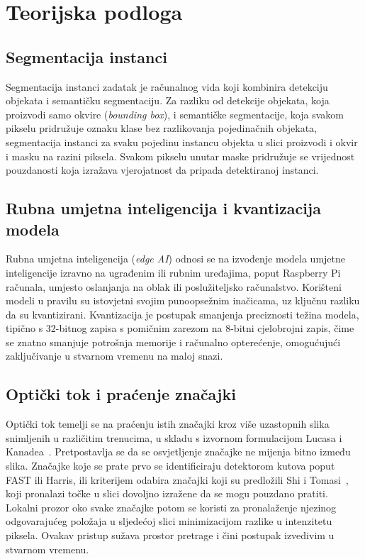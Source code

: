 \section{Teorijska podloga}
\label{sec:teorijska-podloga}

\subsection{Segmentacija instanci}
Segmentacija instanci zadatak je računalnog vida koji kombinira detekciju objekata i semantičku segmentaciju. Za razliku od detekcije objekata, koja proizvodi samo okvire (\emph{bounding box}), i semantičke segmentacije, koja svakom pikselu pridružuje oznaku klase bez razlikovanja pojedinačnih objekata, segmentacija instanci za svaku pojedinu instancu objekta u slici proizvodi i okvir i masku na razini piksela. Svakom pikselu unutar maske pridružuje se vrijednost pouzdanosti koja izražava vjerojatnost da pripada detektiranoj instanci.

\subsection{Rubna umjetna inteligencija i kvantizacija modela}
Rubna umjetna inteligencija (\emph{edge AI}) odnosi se na izvođenje modela umjetne inteligencije izravno na ugrađenim ili rubnim uređajima, poput Raspberry Pi računala, umjesto oslanjanja na oblak ili poslužiteljsko računalstvo. Korišteni modeli u pravilu su istovjetni svojim punoopsežnim inačicama, uz ključnu razliku da su kvantizirani. Kvantizacija je postupak smanjenja preciznosti težina modela, tipično s 32-bitnog zapisa s pomičnim zarezom na 8-bitni cjelobrojni zapis, čime se znatno smanjuje potrošnja memorije i računalno opterećenje, omogućujući zaključivanje u stvarnom vremenu na maloj snazi.

\subsection{Optički tok i praćenje značajki}
Optički tok temelji se na praćenju istih značajki kroz više uzastopnih slika snimljenih u različitim trenucima, u skladu s izvornom formulacijom Lucasa i Kanadea~\cite{lucas1981iterative}. Pretpostavlja se da se osvjetljenje značajke ne mijenja bitno između slika. Značajke koje se prate prvo se identificiraju detektorom kutova poput FAST ili Harris, ili kriterijem odabira značajki koji su predložili Shi i Tomasi~\cite{shi1994good}, koji pronalazi točke u slici dovoljno izražene da se mogu pouzdano pratiti. Lokalni prozor oko svake značajke potom se koristi za pronalaženje njezinog odgovarajućeg položaja u sljedećoj slici minimizacijom razlike u intenzitetu piksela. Ovakav pristup sužava prostor pretrage i čini postupak izvedivim u stvarnom vremenu.

